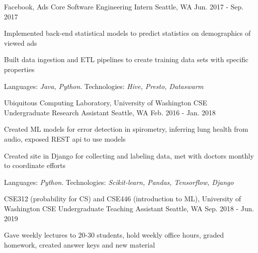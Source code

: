 \begin{cventries}
    \vspace{-1.2em}
  \cventry
    {Facebook, Ads Core}
    {Software Engineering Intern}
    {Seattle, WA}
    {Jun. 2017 - Sep. 2017}
    {
      \begin{cvitems}
    \item {Implemented back-end statistical models to predict statistics on demographics of viewed ads}
    \item {Built data ingestion and ETL pipelines to create training data sets with specific properties}
    \item {Languages: \textit{Java, Python}. Technologies: \textit{Hive, Presto, Dataswarm}}
      \end{cvitems}
    }
    \vspace{-1.2em}

  \cventry
    {Ubiquitous Computing Laboratory, University of Washington CSE}
    {Undergraduate Research Assistant}
    {Seattle, WA}
    {Feb. 2016 - Jan. 2018}
    {
      \begin{cvitems}
        \item {Created ML models for error detection in spirometry, inferring lung health from audio, exposed REST api to use models}
	    \item {Created site in Django for collecting and labeling data, met with doctors monthly to coordinate efforts}
        \item {Languages: \textit{Python}. Technologies: \textit{Scikit-learn, Pandas, Tensorflow, Django}}
      \end{cvitems}
    }
    \vspace{-1.2em}

  \cventry
    {CSE312 (probability for CS) and CSE446 (introduction to ML), University of Washington CSE}
    {Undergraduate Teaching Assistant}
    {Seattle, WA}
    {Sep. 2018 - Jun. 2019}
    {
      \begin{cvitems}
	    \item {Gave weekly lectures to 20-30 students, hold weekly office hours, graded homework, created answer keys and new material}
      \end{cvitems}
    }
    \vspace{-1.2em}

\begin{comment}
  \cventry
    {Schmulevich group, Institute For Systems Biology}
    {Computational Biology Intern}
    {Seattle, WA}
    {Jun. 2016 - Aug 2016}
    {
      \begin{cvitems}
        \item {Utilized python to create genetic simulation pipeline for evaluating gene set analysis algorithms}
	      \item {TA'd 2-week workshop on utilizing machine learning to characterize cancers using biomarkers}
      \end{cvitems}
    }
    \vspace{-0.7em}



\end{comment}
\end{cventries}
